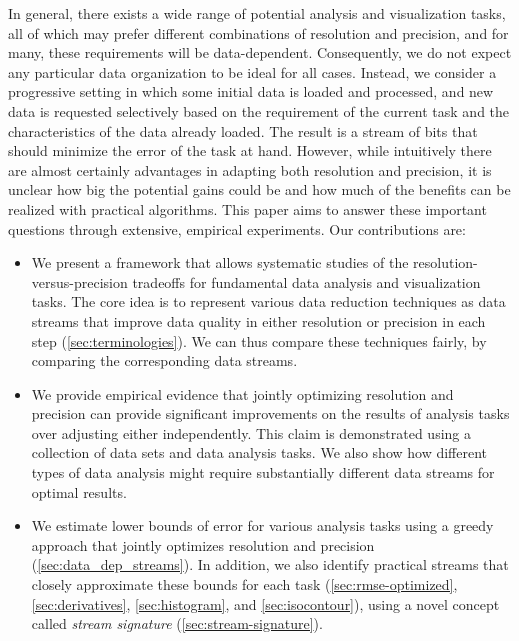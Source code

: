 In general, there exists a wide range of potential analysis and visualization tasks, all of which may
prefer different combinations of resolution and precision, and for many, these requirements will be
data-dependent. Consequently, we do not expect any particular data organization to be ideal for all
cases. Instead, we consider a progressive setting in which some initial data is loaded and processed,
and new data is requested selectively based on the requirement of the current task and the
characteristics of the data already loaded. The result is a stream of bits that should minimize
the error of the task at hand. However, while intuitively there are almost certainly advantages in
adapting both resolution and precision, it is unclear how big the potential gains could be
and how
much of the benefits can be realized with practical algorithms. This paper aims to answer these
important questions through extensive, empirical experiments. Our contributions are:

\begin{itemize}
\item We present a framework that allows systematic studies of the resolution-versus-precision
  tradeoffs for fundamental data analysis and visualization tasks. The core idea is to represent
  various data reduction techniques as data streams that improve data quality in either resolution
  or precision in each step (\cref{sec:terminologies}).
We can thus compare these techniques
  fairly, by comparing the corresponding data streams.
   
\item We provide empirical evidence that jointly optimizing resolution and precision can provide
  significant improvements on the results of analysis tasks over adjusting either independently.
  This claim is demonstrated using a collection of data sets and data analysis tasks. We also show
  how different types of data analysis might require substantially different data streams for
  optimal results.

\item We estimate lower bounds of error
for various analysis tasks using a greedy approach that
  jointly optimizes resolution and precision (\cref{sec:data_dep_streams}).
In addition, we also
  identify practical streams that closely approximate these bounds for each task
  (\cref{sec:rmse-optimized}, \cref{sec:derivatives}, \cref{sec:histogram}, and
  \cref{sec:isocontour}), using a novel concept called \emph{stream signature}
  (\cref{sec:stream-signature}).
\end{itemize}

